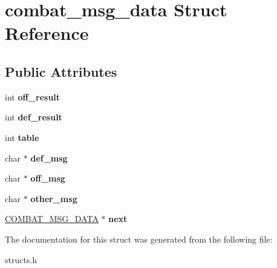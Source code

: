 \hypertarget{structcombat__msg__data}{\section{combat\-\_\-msg\-\_\-data Struct Reference}
\label{structcombat__msg__data}
}
\subsection*{Public Attributes}
\begin{DoxyCompactItemize}
\item 
\hypertarget{structcombat__msg__data_a697ac169958277e61ff19f0429ad2e68}{int {\bfseries off\-\_\-result}}\label{structcombat__msg__data_a697ac169958277e61ff19f0429ad2e68}

\item 
\hypertarget{structcombat__msg__data_acead0497fb7c26b5a855c45ffee56cf0}{int {\bfseries def\-\_\-result}}\label{structcombat__msg__data_acead0497fb7c26b5a855c45ffee56cf0}

\item 
\hypertarget{structcombat__msg__data_a1eb0e986dc3309bcbdee77ec531f9cae}{int {\bfseries table}}\label{structcombat__msg__data_a1eb0e986dc3309bcbdee77ec531f9cae}

\item 
\hypertarget{structcombat__msg__data_a08ef4044d6536017b04f0b3cdfa84ffb}{char $\ast$ {\bfseries def\-\_\-msg}}\label{structcombat__msg__data_a08ef4044d6536017b04f0b3cdfa84ffb}

\item 
\hypertarget{structcombat__msg__data_a2430b7212ddc724ff684e8955dd11e64}{char $\ast$ {\bfseries off\-\_\-msg}}\label{structcombat__msg__data_a2430b7212ddc724ff684e8955dd11e64}

\item 
\hypertarget{structcombat__msg__data_a4bbb926f07588b7cd4d71febf58a63de}{char $\ast$ {\bfseries other\-\_\-msg}}\label{structcombat__msg__data_a4bbb926f07588b7cd4d71febf58a63de}

\item 
\hypertarget{structcombat__msg__data_ae4b16621a8adddebba65dd955cbc5e1e}{\hyperlink{structcombat__msg__data}{C\-O\-M\-B\-A\-T\-\_\-\-M\-S\-G\-\_\-\-D\-A\-T\-A} $\ast$ {\bfseries next}}\label{structcombat__msg__data_ae4b16621a8adddebba65dd955cbc5e1e}

\end{DoxyCompactItemize}


The documentation for this struct was generated from the following file\-:\begin{DoxyCompactItemize}
\item 
structs.\-h\end{DoxyCompactItemize}

